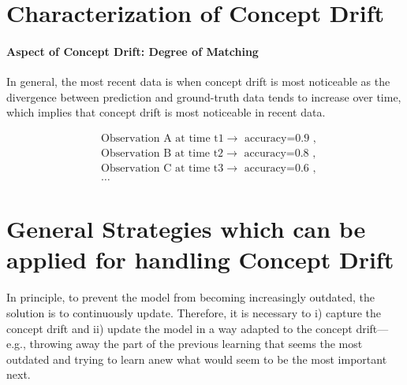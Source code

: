 \section{Characterization of Concept Drift}

\paragraph{Aspect of Concept Drift: Degree of Matching}
In general, the most recent data is when concept drift is most noticeable as the divergence between prediction and ground-truth data tends to increase over time, which implies that concept drift is most noticeable in recent data.


\begin{align*}
& \text{Observation A at time t1}\longrightarrow\text{ accuracy=0.9 },\\
& \text{Observation B at time t2}\longrightarrow\text{ accuracy=0.8 },\\
& \text{Observation C at time t3}\longrightarrow\text{ accuracy=0.6 },\\
& \ldots
\end{align*}




\section{General Strategies which can be applied for handling Concept Drift}
% 
In principle, to prevent the model from becoming increasingly outdated, the solution is to continuously update. Therefore, it is necessary to i) capture the concept drift and ii) update the model in a way adapted to the concept drift---e.g., throwing away the part of the previous learning that seems the most outdated and trying to learn anew what would seem to be the most important next.

